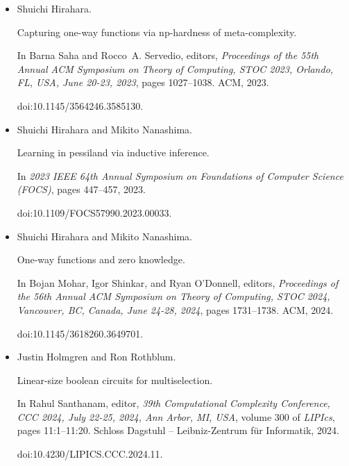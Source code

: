 \documentclass[10pt,a4paper]{article}
\begin{document}
\begin{itemize}
doi:10.1109/FOCS54457.2022.00095.





\item[] 
[17]

Shuichi Hirahara.


Capturing one-way functions via np-hardness of meta-complexity.


In Barna Saha and Rocco A. Servedio, editors, \emph{Proceedings of the
55th Annual ACM Symposium on Theory of Computing, STOC 2023, Orlando, FL,
USA, June 20-23, 2023}, pages 1027–1038. ACM, 2023.


doi:10.1145/3564246.3585130.





\item[] 
[18]

Shuichi Hirahara and Mikito Nanashima.


Learning in pessiland via inductive inference.


In \emph{2023 IEEE 64th Annual Symposium on Foundations of Computer
Science (FOCS)}, pages 447–457, 2023.


doi:10.1109/FOCS57990.2023.00033.





\item[] 
[19]

Shuichi Hirahara and Mikito Nanashima.


One-way functions and zero knowledge.


In Bojan Mohar, Igor Shinkar, and Ryan O’Donnell, editors, \emph{Proceedings of the 56th Annual ACM Symposium on Theory of Computing, STOC
2024, Vancouver, BC, Canada, June 24-28, 2024}, pages 1731–1738. ACM,
2024.


doi:10.1145/3618260.3649701.





\item[] 
[20]

Justin Holmgren and Ron Rothblum.


Linear-size boolean circuits for multiselection.


In Rahul Santhanam, editor, \emph{39th Computational Complexity
Conference, CCC 2024, July 22-25, 2024, Ann Arbor, MI, USA}, volume 300
of \emph{LIPIcs}, pages 11:1–11:20. Schloss Dagstuhl – Leibniz-Zentrum
für Informatik, 2024.


doi:10.4230/LIPICS.CCC.2024.11.






\end{itemize}
\end{document}
